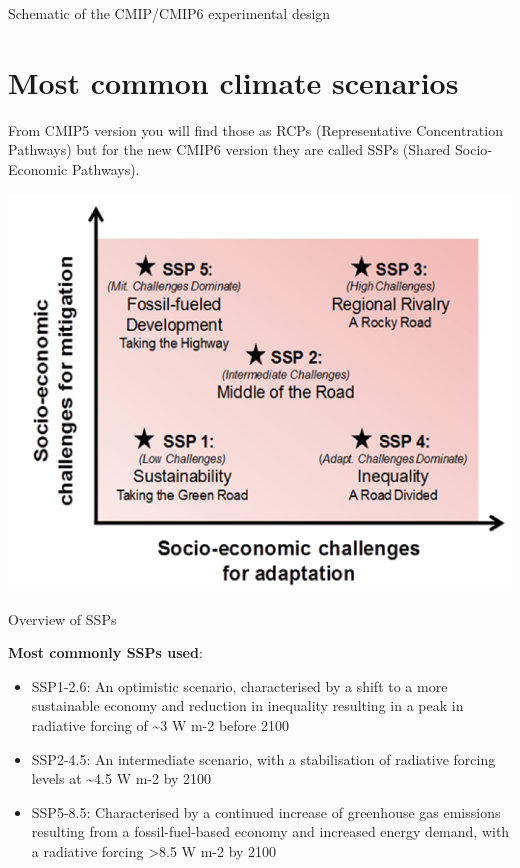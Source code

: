 \documentclass[]{book}
\providecommand{\tightlist}{%
  \setlength{\itemsep}{0pt}\setlength{\parskip}{0pt}}
\begin{document}
Schematic of the CMIP/CMIP6 experimental design

\hypertarget{most-common-climate-scenarios}{%
\section{Most common climate scenarios}\label{most-common-climate-scenarios}}

From CMIP5 version you will find those as RCPs (Representative Concentration Pathways) but for the new CMIP6 version they are called SSPs (Shared Socio‐Economic Pathways).

\begin{center}\includegraphics[width=1\linewidth]{images/ssps} \end{center}

Overview of SSPs

\textbf{Most commonly SSPs used}:

\begin{itemize}
\tightlist
\item
  SSP1-2.6: An optimistic scenario, characterised by a shift to a more sustainable economy and reduction in inequality resulting in a peak in radiative forcing of \textasciitilde{}3 W m-2 before 2100
\item
  SSP2-4.5: An intermediate scenario, with a stabilisation of radiative forcing levels at \textasciitilde{}4.5 W m-2 by 2100
\item
  SSP5-8.5: Characterised by a continued increase of greenhouse gas emissions resulting from a fossil-fuel-based economy and increased energy demand, with a radiative forcing \textgreater{}8.5 W m-2 by 2100
\end{itemize}
\end{document}
